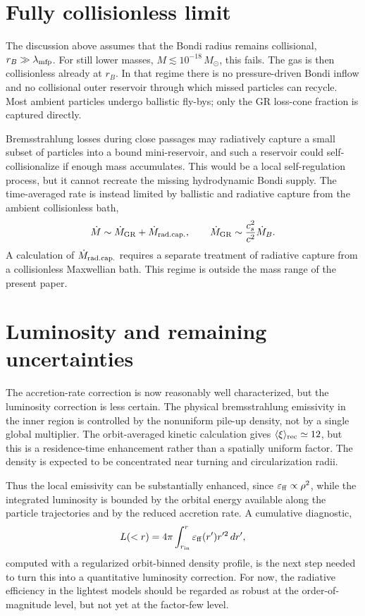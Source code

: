 \documentclass[12pt]{article}
\newcommand{\Msun}{M_\odot}
\newcommand{\Mdot}{\dot{M}}
\newcommand{\MdotB}{\dot{M}_B}
\newcommand{\mfp}{\lambda_{\rm mfp}}
\begin{document}
\section{Fully collisionless limit}
\label{app:fully_collisionless}

The discussion above assumes that the Bondi radius remains collisional,
$r_B\gg\mfp$. For still lower masses, $M\lesssim10^{-18}\,\Msun$,
this fails. The gas is then collisionless already at $r_B$. In that
regime there is no pressure-driven Bondi inflow and no collisional outer
reservoir through which missed particles can recycle. Most ambient
particles undergo ballistic fly-bys; only the GR loss-cone fraction is
captured directly.

Bremsstrahlung losses during close passages may radiatively capture a
small subset of particles into a bound mini-reservoir, and such a
reservoir could self-collisionalize if enough mass accumulates. This
would be a local self-regulation process, but it cannot recreate the
missing hydrodynamic Bondi supply. The time-averaged rate is instead
limited by ballistic and radiative capture from the ambient collisionless
bath,
\begin{equation}
  \Mdot \sim \Mdot_{\rm GR}+\Mdot_{\rm rad.cap.},
  \qquad
  \Mdot_{\rm GR}\sim\frac{c_s^2}{c^2}\MdotB.
\end{equation}
A calculation of $\Mdot_{\rm rad.cap.}$ requires a separate treatment of
radiative capture from a collisionless Maxwellian bath. This regime is
outside the mass range of the present paper.

\section{Luminosity and remaining uncertainties}
\label{app:luminosity}

The accretion-rate correction is now reasonably well characterized, but
the luminosity correction is less certain. The physical bremsstrahlung
emissivity in the inner region is controlled by the nonuniform pile-up
density, not by a single global multiplier. The orbit-averaged kinetic
calculation gives $\langle\xi\rangle_{\rm rec}\simeq12$, but this is a
residence-time enhancement rather than a spatially uniform factor. The
density is expected to be concentrated near turning and circularization
radii.

Thus the local emissivity can be substantially enhanced, since
$\varepsilon_{\rm ff}\propto\rho^2$, while the integrated luminosity is
bounded by the orbital energy available along the particle trajectories
and by the reduced accretion rate. A cumulative diagnostic,
\begin{equation}
  L(<r)=4\pi\int_{r_{\rm in}}^r \varepsilon_{\rm ff}(r')r'^2\,dr',
\end{equation}
computed with a regularized orbit-binned density profile, is the next
step needed to turn this into a quantitative luminosity correction. For
now, the radiative efficiency in the lightest models should be regarded
as robust at the order-of-magnitude level, but not yet at the factor-few
level.
\end{document}
